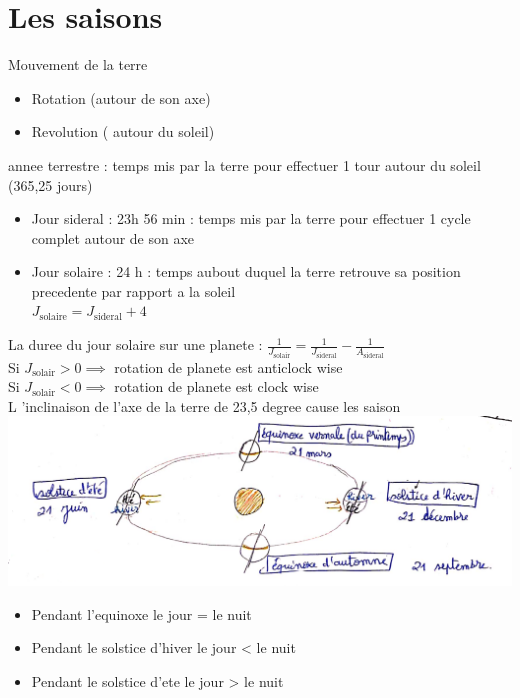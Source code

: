 \documentclass[12pt]{book}
\begin{document}
    \chapter{Les saisons}
        Mouvement de la terre \begin{itemize}
            \item Rotation (autour de son axe)
            \item Revolution ( autour du soleil)
        \end{itemize}
        annee terrestre : temps mis par la terre pour effectuer 1 tour autour du soleil (365,25 jours)
        \begin{itemize}
            \item Jour sideral : 23h 56 min : temps mis par la terre pour effectuer 1 cycle complet autour de son axe 
            \item Jour solaire : 24 h : temps aubout duquel la terre retrouve sa position precedente par rapport a la soleil \\
                $ J_{\text{solaire}} = J_{\text{sideral}} + 4 $
        \end{itemize}
        La duree du jour solaire sur une planete : $ \frac{1}{J_{\text{solair}}} = \frac{1}{J_{\text{sideral}}} - \frac{1}{A_{\text{sideral}}} $ \\
        Si $ J_\text{solair} > 0 \implies  $ rotation de planete est anticlock wise\\
        Si $ J_\text{solair} < 0 \implies  $ rotation de planete est clock wise \\
        \pagebreak
        L 'inclinaison de l'axe de la terre de 23,5 degree cause les saison\\
            \includegraphics[width=1\linewidth]{pic/seasons.png}
            \begin{itemize}
                \item Pendant l'equinoxe le jour = le nuit 
                \item Pendant le solstice d'hiver le jour < le nuit 
                \item Pendant le solstice d'ete le jour > le nuit 
            \end{itemize}
\end{document}
